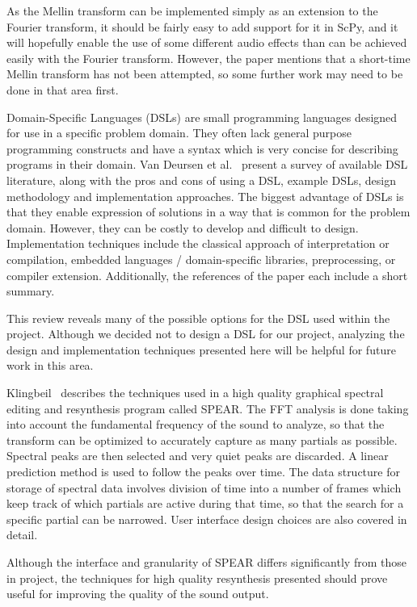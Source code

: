 \documentclass{article}
\begin{document}
As the Mellin transform can be implemented simply as an extension to the Fourier transform, it
should be fairly easy to add support for it in ScPy, and it will hopefully enable the use of
some different audio effects than can be achieved easily with the Fourier transform. However, the
paper mentions that a short-time Mellin transform has not been attempted, so some further work may
need to be done in that area first.

Domain-Specific Languages (DSLs) are small programming languages designed for use in a specific
problem domain. They often lack general purpose programming constructs and have a syntax which is
very concise for describing programs in their domain. Van Deursen et al.~\cite{van2000domain}
present a survey of available DSL literature, along with the pros and cons of using a DSL, example
DSLs, design methodology and implementation approaches. The biggest advantage of DSLs is that they
enable expression of solutions in a way that is common for the problem domain. However, they can be
costly to develop and difficult to design. Implementation techniques include the classical approach
of interpretation or compilation, embedded languages / domain-specific libraries, preprocessing, or
compiler extension. Additionally, the references of the paper each include a short summary.

This review reveals many of the possible options for the DSL used within the project. Although we
decided not to design a DSL for our project, analyzing the design and implementation techniques
presented here will be helpful for future work in this area.

Klingbeil~\cite{klingbeil2005software} describes the techniques used in a high quality graphical
spectral editing and resynthesis program called SPEAR\@. The FFT analysis is done taking into
account the fundamental frequency of the sound to analyze, so that the transform can be optimized
to accurately capture as many partials as possible. Spectral peaks are then selected and very quiet
peaks are discarded. A linear prediction method is used to follow the peaks over time. The data
structure for storage of spectral data involves division of time into a number of frames which keep
track of which partials are active during that time, so that the search for a specific partial can
be narrowed. User interface design choices are also covered in detail.

Although the interface and granularity of SPEAR differs significantly from those in project, the
techniques for high quality resynthesis presented should prove useful for improving the quality of
the sound output.
\end{document}
